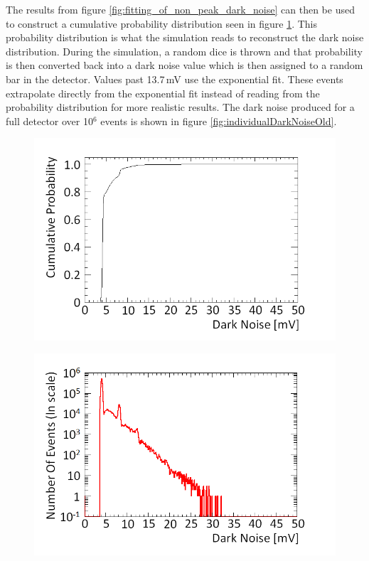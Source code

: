 The results from figure \ref{fig:fitting_of_non_peak_dark_noise} can then be used to construct a cumulative probability distribution seen in figure \ref{fig:cumulative_prob_dark}. This probability distribution is what the simulation reads to reconstruct the dark noise distribution. During the simulation, a random dice is thrown and that probability is then converted back into a dark noise value which is then assigned to a random bar in the detector. Values past 13.7\,mV use the exponential fit. These events extrapolate directly from the exponential fit instead of reading from the probability distribution for more realistic results. The dark noise produced for a full detector over 10$^6$ events is shown in figure \ref{fig:individualDarkNoiseOld}. 

\begin{figure}[!h]
\centering
\begin{minipage}{.45\textwidth}
  \centering
  \includegraphics[width=\linewidth]{Chapter4/Figs/Raster/cumulative_prob_dark_noiseMedText.png}
  \label{fig:cumulative_prob_dark}
  \vspace{1.2654cm}%
\end{minipage}%
\qquad
\begin{minipage}{.45\textwidth}
  \centering
  \includegraphics[width=\linewidth]{Chapter4/Figs/darkNoiseLogMedText.png} 

\end{minipage}
\end{figure}
